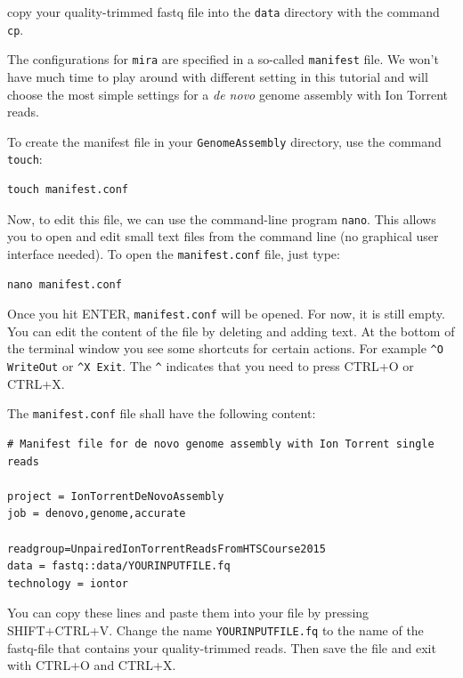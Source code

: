 \documentclass[11pt]{article}
\begin{document}
copy your quality-trimmed fastq file into the \texttt{data} directory with the command \texttt{cp}. 

The configurations for \texttt{mira} are specified in a so-called
\texttt{manifest} file. We won't have much time to play around with different
setting in this tutorial and will choose the most simple settings for
a \emph{de novo} genome assembly with Ion Torrent reads.


To create the manifest file in your \texttt{GenomeAssembly} directory, use
the command \texttt{touch}:

\begin{verbatim}
touch manifest.conf
\end{verbatim}

Now, to edit this file, we can use the command-line program
\texttt{nano}. This allows you to open and edit small text files from the command
line (no graphical user interface needed). To open the \texttt{manifest.conf}
file, just type:

\begin{verbatim}
nano manifest.conf
\end{verbatim}

Once you hit ENTER, \texttt{manifest.conf} will be opened. For now, it is
still empty. You can edit the content of the file by deleting and
adding text. At the bottom of the terminal window you see some
shortcuts for certain actions. For example \texttt{\textasciicircum{}O WriteOut} or 
\texttt{\textasciicircum{}X Exit}. The \texttt{\textasciicircum{}} indicates that you need to press CTRL+O or CTRL+X.

The \texttt{manifest.conf} file shall have the following content:

\begin{verbatim}
# Manifest file for de novo genome assembly with Ion Torrent single reads

project = IonTorrentDeNovoAssembly
job = denovo,genome,accurate

readgroup=UnpairedIonTorrentReadsFromHTSCourse2015
data = fastq::data/YOURINPUTFILE.fq
technology = iontor
\end{verbatim}

You can copy these lines and paste them into your file by pressing
SHIFT+CTRL+V. Change the name \texttt{YOURINPUTFILE.fq} to the name of the
fastq-file that contains your quality-trimmed reads. Then save the
file and exit with CTRL+O and CTRL+X.
\end{document}

